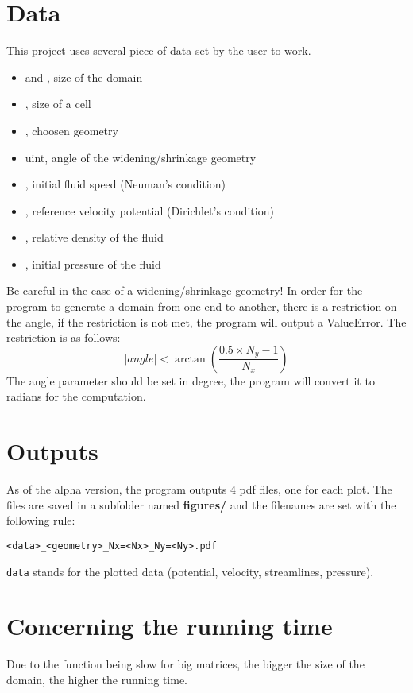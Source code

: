 \section{Data}
This project uses several piece of data set by the user to work.
\begin{itemize}
      \item {} \textcolor{dtype}{} and
             \textcolor{dtype}{}, size of the domain
      \item {} \textcolor{dtype}{}, size of a cell
      \item {}, choosen geometry
      \item {} \textcolor{dtype}{uint}, angle of the
            widening/shrinkage geometry
      \item {}, initial fluid speed (Neuman's condition)
      \item {}, reference velocity potential (Dirichlet's
            condition)
      \item {}, relative density of the fluid
      \item {}, initial pressure of the fluid
\end{itemize}
Be careful in the case of a widening/shrinkage geometry!
In order for the program to generate a domain from one end to another, there is
a restriction on the angle, if the restriction is not met, the program will
output a ValueError. The restriction is as follows:
\[
      |angle| < \arctan{\left(\dfrac{0.5 \times N_y - 1}{N_x}\right)}
\]
The angle parameter should be set in degree, the program will convert it to
radians for the computation.

\section{Outputs}
As of the alpha version, the program outputs 4 pdf files, one for each plot.
The files are saved in a subfolder named \textbf{figures/} and the filenames
are set with the following rule:

\begin{center}
      \texttt{<data>_<geometry>_Nx=<Nx>_Ny=<Ny>.pdf}
\end{center}
\texttt{data} stands for the plotted data (potential, velocity,
streamlines, pressure).
\section{Concerning the running time}
Due to the function  being slow for
big matrices, the bigger the size of the domain, the higher the running time.

